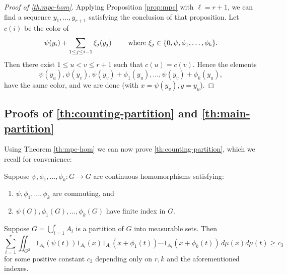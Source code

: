 \begin{proof}[Proof of \cref{th:mpc-hom}]
Applying Proposition \ref{prop:mpc} with $\ell=r+1$, we can find a sequence $y_1, \ldots, y_{r+1}$ satisfying the conclusion of that proposition. Let $c(i)$ be the color of
\[
\psi(y_i) + \sum_{1 \leq j \leq i-1} \xi_j (y_j) \qquad \textup{ where } \xi_j \in \{ 0, \psi, \phi_1, \ldots, \phi_k \}.
\]
Then there exist $1 \leq u < v \leq r+1$ such that $c(u) = c(v)$. Hence the elements
\[
\psi(y_u), \psi(y_v), \psi(y_v) + \phi_1(y_u), \ldots, \psi(y_v) + \phi_k(y_u), 
\]
have the same color, and we are done (with $x=\psi(y_v), y=y_u$).
\end{proof}


\subsection{Proofs of \texorpdfstring{\cref{th:counting-partition}}{Theorem 1.11} and \texorpdfstring{\cref{th:main-partition}}{Theorem 1.5}}

Using Theorem \ref{th:mpc-hom} we can now prove \cref{th:counting-partition}, which we recall for convenience:

\begin{theorem*} 
Suppose $\psi, \phi_1, \ldots, \phi_k: G \to G$ are continuous homomorphisms satisfying:
\begin{enumerate}
\item $\psi, \phi_1, \ldots, \phi_k$ are commuting, and

\item $\psi(G), \phi_1(G), \ldots, \phi_k(G)$ have finite index in $G$.
\end{enumerate}
Suppose $G = \bigcup_{i=1}^r A_i$ is a partition of $G$ into measurable sets. Then 
\begin{equation*} 
\sum_{i=1}^r \iint_{G^2} 1_{A_i}(\psi(t)) 1_{A_i}(x) 1_{A_i}(x + \phi_1(t)) \cdots 1_{A_i}(x + \phi_k(t)) \, d \mu(x) d\mu(t) \geq c_3
\end{equation*} 
for some positive constant $c_3$ depending only on $r, k$ and the aforementioned indexes.
\end{theorem*}

